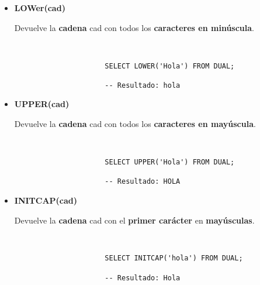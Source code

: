 \begin{itemize}
    \item \textbf{LOWer(cad)}

    Devuelve la \textbf{cadena} cad con todos los \textbf{caracteres en minúscula}.

    \begin{figure}[H]
        \begin{tcolorbox}[sharp corners, colback=yellow!30, colframe=white!20]
            \scriptsize
            \begin{verbatim}


                SELECT LOWER('Hola') FROM DUAL;

                -- Resultado: hola
            \end{verbatim}
        \end{tcolorbox}
    \end{figure}

    \item \textbf{UPPER(cad)}

    Devuelve la \textbf{cadena} cad con todos los \textbf{caracteres en mayúscula}.

    \begin{figure}[H]
        \begin{tcolorbox}[sharp corners, colback=yellow!30, colframe=white!20]
            \scriptsize
            \begin{verbatim}


                SELECT UPPER('Hola') FROM DUAL;

                -- Resultado: HOLA
            \end{verbatim}
        \end{tcolorbox}
    \end{figure}

    \item \textbf{INITCAP(cad)}

    Devuelve la \textbf{cadena} cad con el \textbf{primer carácter} en \textbf{mayúsculas}.

    \begin{figure}[H]
        \begin{tcolorbox}[sharp corners, colback=yellow!30, colframe=white!20]
            \scriptsize
            \begin{verbatim}


                SELECT INITCAP('hola') FROM DUAL;

                -- Resultado: Hola
            \end{verbatim}
        \end{tcolorbox}
    \end{figure}
\end{itemize}
\appendix

